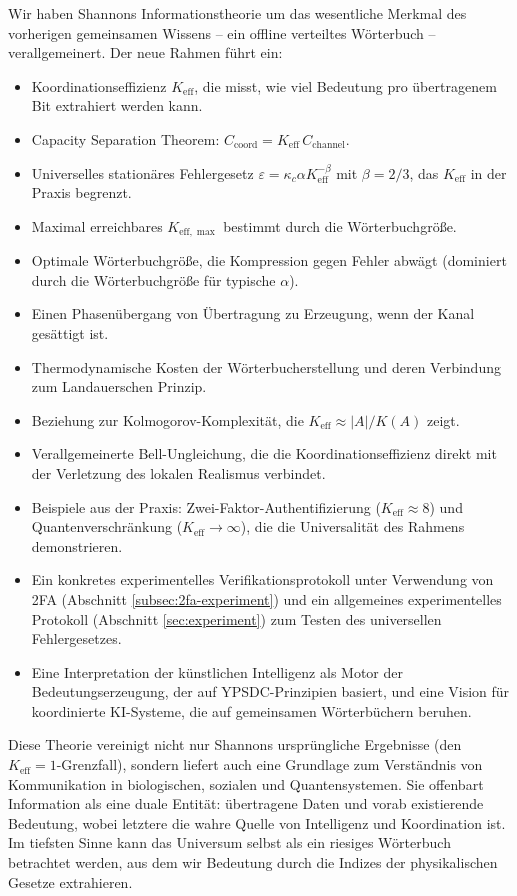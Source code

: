 \documentclass[12pt,a4paper]{article}
\theoremstyle{remark}
\newcommand{\Keff}{K_{\mathrm{eff}}}
\newcommand{\Keffmax}{K_{\mathrm{eff},\max}}
\begin{document}
	Wir haben Shannons Informationstheorie um das wesentliche Merkmal des vorherigen gemeinsamen Wissens – ein offline verteiltes Wörterbuch – verallgemeinert. Der neue Rahmen führt ein:
	\begin{itemize}
		\item Koordinationseffizienz $\Keff$, die misst, wie viel Bedeutung pro übertragenem Bit extrahiert werden kann.
		\item Capacity Separation Theorem: $C_{\text{coord}} = \Keff \, C_{\text{channel}}$.
		\item Universelles stationäres Fehlergesetz $\varepsilon = \kappa_c\alpha K_{\mathrm{eff}}^{-\beta}$ mit $\beta=2/3$, das $\Keff$ in der Praxis begrenzt.
		\item Maximal erreichbares $\Keffmax$ bestimmt durch die Wörterbuchgröße.
		\item Optimale Wörterbuchgröße, die Kompression gegen Fehler abwägt (dominiert durch die Wörterbuchgröße für typische $\alpha$).
		\item Einen Phasenübergang von Übertragung zu Erzeugung, wenn der Kanal gesättigt ist.
		\item Thermodynamische Kosten der Wörterbucherstellung und deren Verbindung zum Landauerschen Prinzip.
		\item Beziehung zur Kolmogorov-Komplexität, die $\Keff \approx |A|/K(A)$ zeigt.
		\item Verallgemeinerte Bell-Ungleichung, die die Koordinationseffizienz direkt mit der Verletzung des lokalen Realismus verbindet.
		\item Beispiele aus der Praxis: Zwei-Faktor-Authentifizierung ($\Keff \approx 8$) und Quantenverschränkung ($\Keff \to \infty$), die die Universalität des Rahmens demonstrieren.
		\item Ein konkretes experimentelles Verifikationsprotokoll unter Verwendung von 2FA (Abschnitt \ref{subsec:2fa-experiment}) und ein allgemeines experimentelles Protokoll (Abschnitt \ref{sec:experiment}) zum Testen des universellen Fehlergesetzes.
		\item Eine Interpretation der künstlichen Intelligenz als Motor der Bedeutungserzeugung, der auf YPSDC-Prinzipien basiert, und eine Vision für koordinierte KI-Systeme, die auf gemeinsamen Wörterbüchern beruhen.
	\end{itemize}
	
	Diese Theorie vereinigt nicht nur Shannons ursprüngliche Ergebnisse (den $\Keff=1$-Grenzfall), sondern liefert auch eine Grundlage zum Verständnis von Kommunikation in biologischen, sozialen und Quantensystemen. Sie offenbart Information als eine duale Entität: übertragene Daten und vorab existierende Bedeutung, wobei letztere die wahre Quelle von Intelligenz und Koordination ist. Im tiefsten Sinne kann das Universum selbst als ein riesiges Wörterbuch betrachtet werden, aus dem wir Bedeutung durch die Indizes der physikalischen Gesetze extrahieren.
	
\end{document}
